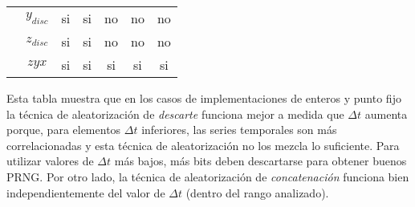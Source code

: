 \begin{table*} [tb]
\begin{center}
\begin{tabular}{c|c|c|c|c|c|c|}
	\multicolumn{1}{|c|}{}                         &    $y_{disc}$    &    si    &    si     &     no     &     no      &      no      \\ \cline{2-7}
	\multicolumn{1}{|c|}{}                         &    $z_{disc}$    &    si    &    si     &     no     &     no      &      no      \\ \cline{2-7}
	\multicolumn{1}{|c|}{}                         &      $zyx$       &    si    &    si     &     si     &     si      &      si      \\ \hline
\end{tabular}
\end{center}
\label{tabla:Tabla2}
\end{table*}


Esta tabla muestra que en los casos de implementaciones de enteros y punto fijo la técnica de aleatorización de \textit{descarte} funciona mejor a medida que $\Delta t$ aumenta porque, para elementos $\Delta t$ inferiores, las series temporales son más correlacionadas y esta técnica de aleatorización no los mezcla lo suficiente.
Para utilizar valores de $\Delta t$ más bajos, más bits deben descartarse para obtener buenos PRNG.
Por otro lado, la técnica de aleatorización de \textit{concatenación} funciona bien independientemente del valor de $\Delta t$ (dentro del rango analizado).